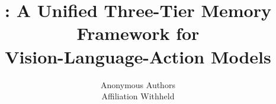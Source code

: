\documentclass[letterpaper]{article}
\title{\method: A Unified Three-Tier Memory Framework for\\
       Vision-Language-Action Models}
\author{
  Anonymous Authors \\
  Affiliation Withheld
}
\begin{document}
\maketitle

\begin{abstract}

\end{abstract}











\appendix

\end{document}
